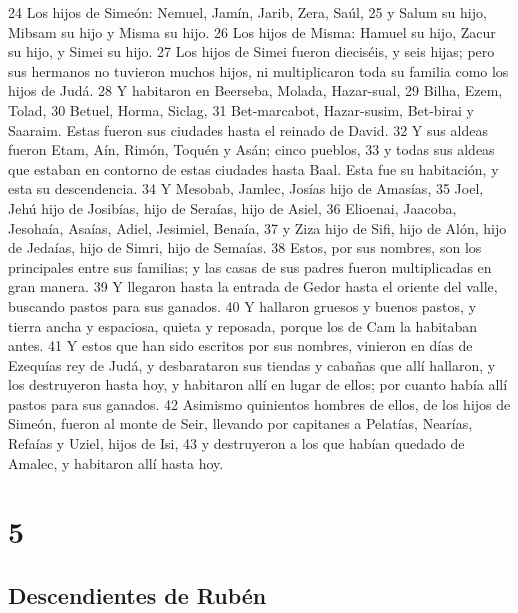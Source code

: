 24 Los hijos de Simeón: Nemuel, Jamín, Jarib, Zera, Saúl,
25 y Salum su hijo, Mibsam su hijo y Misma su hijo.
26 Los hijos de Misma: Hamuel su hijo, Zacur su hijo, y Simei su hijo.
27 Los hijos de Simei fueron dieciséis, y seis hijas; pero sus hermanos no tuvieron muchos hijos, ni multiplicaron toda su familia como los hijos de Judá.
28 Y habitaron en Beerseba, Molada, Hazar-sual,
29 Bilha, Ezem, Tolad,
30 Betuel, Horma, Siclag,
31 Bet-marcabot, Hazar-susim, Bet-birai y Saaraim. Estas fueron sus ciudades hasta el reinado de David.
32 Y sus aldeas fueron Etam, Aín, Rimón, Toquén y Asán; cinco pueblos,
33 y todas sus aldeas que estaban en contorno de estas ciudades hasta Baal. Esta fue su habitación, y esta su descendencia.
34 Y Mesobab, Jamlec, Josías hijo de Amasías,
35 Joel, Jehú hijo de Josibías, hijo de Seraías, hijo de Asiel,
36 Elioenai, Jaacoba, Jesohaía, Asaías, Adiel, Jesimiel, Benaía,
37 y Ziza hijo de Sifi, hijo de Alón, hijo de Jedaías, hijo de Simri, hijo de Semaías.
38 Estos, por sus nombres, son los principales entre sus familias; y las casas de sus padres fueron multiplicadas en gran manera.
39 Y llegaron hasta la entrada de Gedor hasta el oriente del valle, buscando pastos para sus ganados.
40 Y hallaron gruesos y buenos pastos, y tierra ancha y espaciosa, quieta y reposada, porque los de Cam la habitaban antes.
41 Y estos que han sido escritos por sus nombres, vinieron en días de Ezequías rey de Judá, y desbarataron sus tiendas y cabañas que allí hallaron, y los destruyeron hasta hoy, y habitaron allí en lugar de ellos; por cuanto había allí pastos para sus ganados.
42 Asimismo quinientos hombres de ellos, de los hijos de Simeón, fueron al monte de Seir, llevando por capitanes a Pelatías, Nearías, Refaías y Uziel, hijos de Isi,
43 y destruyeron a los que habían quedado de Amalec, y habitaron allí hasta hoy.

\chapter{5}

\section*{Descendientes de Rubén}

